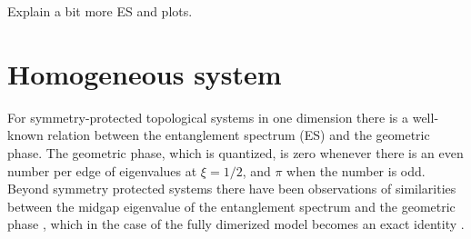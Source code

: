 \documentclass[twocolumn,amsmath,longbibliography,amssymb,superscriptaddress]{revtex4-1}
\newcommand{\carlos}[1]{{\color{red} #1}}
\begin{document}
\carlos{Explain a bit more ES and plots.}

\section{Homogeneous system}

For symmetry-protected topological systems in one dimension there is a well-known relation between the entanglement spectrum  (ES) and the geometric phase. The geometric phase, which is quantized, is zero whenever there is an even number per edge of eigenvalues at $\xi = 1/2$, and $\pi$ when the number is odd. Beyond symmetry protected systems there have been observations of similarities between the midgap eigenvalue of the entanglement spectrum and the geometric phase \cite{Ryu2006,Huang2012,Huang2012-2}, which in the case of the fully dimerized model becomes an exact identity \cite{Ryu2006}. 
\end{document}
